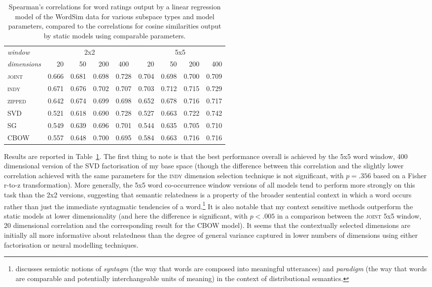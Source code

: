 \begin{table}
\centering
\begin{tabular}{lrrrr|rrrr}
\hline
\emph{window} & \multicolumn{4}{c}{2x2} & \multicolumn{4}{c}{5x5} \\
\emph{dimensions} & 20 & 50 & 200 & \multicolumn{1}{c}{400} & 20 & 50 & 200 & 400 \\
\hline
\textsc{joint} & 0.666 & 0.681 & 0.698 & 0.728 & 0.704 & 0.698 & 0.700 & 0.709 \\
\textsc{indy} & 0.671 & 0.676 & 0.702 & 0.707 & 0.703 & 0.712 & 0.715 & 0.729 \\
\textsc{zipped} & 0.642 & 0.674 & 0.699 & 0.698 & 0.652 & 0.678 & 0.716 & 0.717 \\
\textsc{SVD} & 0.521 & 0.618 & 0.690 & 0.728 & 0.527 & 0.663 & 0.722 & 0.742 \\
\textsc{SG} & 0.549 & 0.639 & 0.696 & 0.701 & 0.544 & 0.635 & 0.705 & 0.710 \\
\textsc{CBOW} & 0.557 & 0.648 & 0.700 & 0.695 & 0.584 & 0.663 & 0.716 & 0.716 \\
\hline
\end{tabular}
\caption[Spearman's Correlations for Relatedness]{Spearman's correlations for word ratings output by a linear regression model of the WordSim data for various subspace types and model parameters, compared to the correlations for cosine similarities output by static models using comparable parameters.}
\label{tab:related}
\end{table}

Results are reported in Table~\ref{tab:related}.  The first thing to note is that the best performance overall is achieved by the 5x5 word window, 400 dimensional version of the SVD factorisation of my base space (though the difference between this correlation and the slightly lower correlation achieved with the same parameters for the \textsc{indy} dimension selection technique is not significant, with $p = .356$ based on a Fisher r-to-z transformation).  More generally, the 5x5 word co-occurrence window versions of all models tend to perform more strongly on this task than the 2x2 versions, suggesting that semantic relatedness is a property of the broader sentential context in which a word occurs rather than just the immediate syntagmatic tendencies of a word.\footnote{\cite{Sahlgren2008} discusses  semiotic notions of \emph{syntagm} (the way that words are composed into meaningful utterances) and \emph{paradigm} (the way that words are comparable and potentially interchangeable units of meaning) in the context of distributional semantics.}  It is also notable that my context sensitive methods outperform the static models at lower dimensionality (and here the difference is significant, with $p < .005$ in a comparison between the \textsc{joint} 5x5 window, 20 dimensional correlation and the corresponding result for the \textsc{CBOW} model).  It seems that the contextually selected dimensions are initially all more informative about relatedness than the degree of general variance captured in lower numbers of dimensions using either factorisation or neural modelling techniques.

